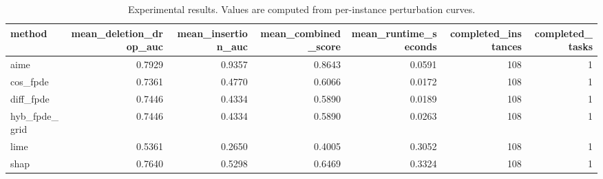 \begin{table}[t]
\caption{Experimental results. Values are computed from per-instance perturbation curves.}
\label{tab:main_results_computed}
\centering
\begin{tabular}{lrrrrrr}
\toprule
method & mean\_deletion\_drop\_auc & mean\_insertion\_auc & mean\_combined\_score & mean\_runtime\_seconds & completed\_instances & completed\_tasks \\
\midrule
aime & 0.7929 & 0.9357 & 0.8643 & 0.0591 & 108 & 1 \\
cos\_fpde & 0.7361 & 0.4770 & 0.6066 & 0.0172 & 108 & 1 \\
diff\_fpde & 0.7446 & 0.4334 & 0.5890 & 0.0189 & 108 & 1 \\
hyb\_fpde\_grid & 0.7446 & 0.4334 & 0.5890 & 0.0263 & 108 & 1 \\
lime & 0.5361 & 0.2650 & 0.4005 & 0.3052 & 108 & 1 \\
shap & 0.7640 & 0.5298 & 0.6469 & 0.3324 & 108 & 1 \\
\bottomrule
\end{tabular}

\end{table}
